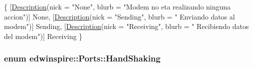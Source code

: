 \begin{DoxyCode}
                                       \{
                        [\hyperlink{namespaceedwinspire_1_1_ports_a3b5ab9c73da132e47d164f322cf54904}{Description}(nick = \textcolor{stringliteral}{"None"}, blurb = \textcolor{stringliteral}{"Modem
       no eta realizando ninguna accion"})]
                        None,  
                        [\hyperlink{namespaceedwinspire_1_1_ports_a3b5ab9c73da132e47d164f322cf54904}{Description}(nick = \textcolor{stringliteral}{"Sending"}, blurb = \textcolor{stringliteral}{"
      Enviando datos al modem"})]
                        Sending, 
                        [\hyperlink{namespaceedwinspire_1_1_ports_a3b5ab9c73da132e47d164f322cf54904}{Description}(nick = \textcolor{stringliteral}{"Receiving"}, blurb = \textcolor{stringliteral}{"
      Recibiendo datos del modem"})]
                        Receiving
                \}
\end{DoxyCode}
\hypertarget{namespaceedwinspire_1_1_ports_afd526aa1ebf856f40b0dfdbef71f7077}{
\subsubsection[{Hand\-Shaking}]{\setlength{\rightskip}{0pt plus 5cm}enum {\bf edwinspire\-::\-Ports\-::\-Hand\-Shaking}}}\label{namespaceedwinspire_1_1_ports_afd526aa1ebf856f40b0dfdbef71f7077}
